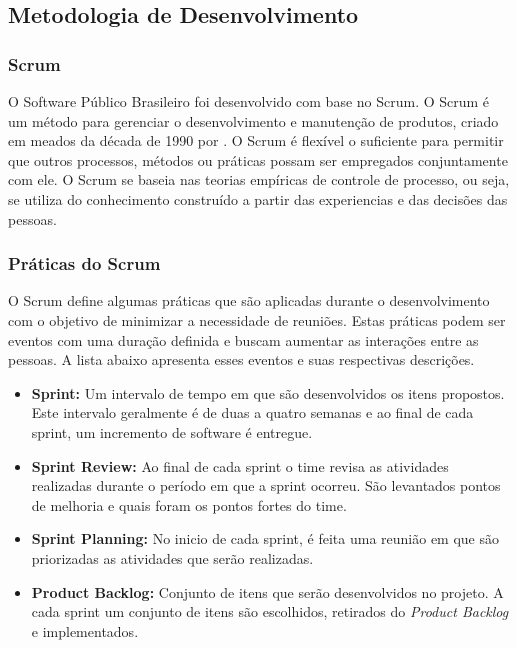 \subsection{Metodologia de Desenvolvimento}
\label{est:sof:met}

\subsubsection{Scrum}


O Software Público Brasileiro foi desenvolvido com base no Scrum. O
Scrum é um método para gerenciar o desenvolvimento e manutenção de produtos, criado em meados da década de 1990 por . O Scrum é flexível o suficiente para permitir que outros processos, métodos ou práticas possam ser empregados conjuntamente com ele.
O Scrum se baseia nas teorias empíricas de controle de processo, ou seja,
se utiliza do conhecimento construído a partir das experiencias e das decisões das pessoas. \cite{Schw01a}

\subsubsection{Práticas do Scrum}
\label{est:sof:met:pra}

O Scrum define algumas práticas que são aplicadas durante o desenvolvimento com 
o objetivo de minimizar a necessidade de reuniões. Estas práticas podem ser eventos
com uma duração definida e buscam aumentar as interações entre as pessoas. A lista
abaixo apresenta esses eventos e suas respectivas descrições.

\begin{itemize}
    \item \textbf{Sprint:} Um intervalo de tempo em que são desenvolvidos os itens
        propostos. Este intervalo geralmente é de duas a quatro semanas e ao final
        de cada sprint, um incremento de software é entregue.
    \item \textbf{Sprint Review:} Ao final de cada sprint o time revisa as atividades
        realizadas durante o período em que a sprint ocorreu. São levantados pontos de
        melhoria e quais foram os pontos fortes do time.
    \item \textbf{Sprint Planning:} No inicio de cada sprint, é feita uma reunião em
        que são priorizadas as atividades que serão realizadas.
    \item \textbf{Product Backlog:} Conjunto de itens que serão desenvolvidos no projeto.
        A cada sprint um conjunto de itens são escolhidos, retirados do \textit{Product
        Backlog} e implementados.
\end{itemize}

